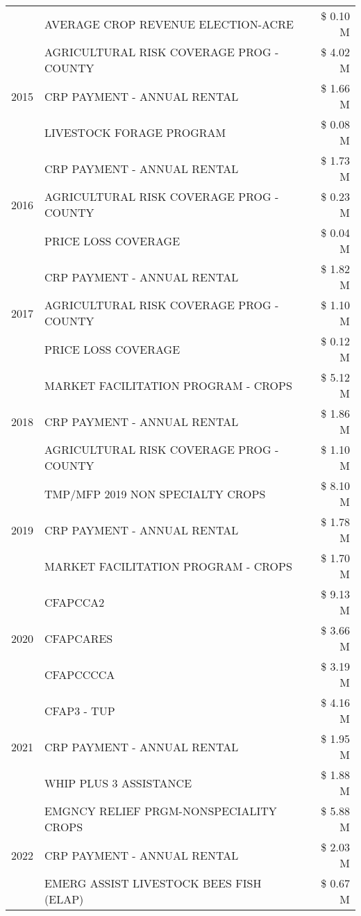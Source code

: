 \begin{tabular}{llr}
 & AVERAGE CROP REVENUE ELECTION-ACRE & \$ 0.10 M \\
\cline{1-3}
\multirow[t]{3}{*}{2015} & AGRICULTURAL RISK COVERAGE PROG - COUNTY & \$ 4.02 M \\
 & CRP PAYMENT - ANNUAL RENTAL & \$ 1.66 M \\
 & LIVESTOCK FORAGE PROGRAM & \$ 0.08 M \\
\cline{1-3}
\multirow[t]{3}{*}{2016} & CRP PAYMENT - ANNUAL RENTAL & \$ 1.73 M \\
 & AGRICULTURAL RISK COVERAGE PROG - COUNTY & \$ 0.23 M \\
 & PRICE LOSS COVERAGE & \$ 0.04 M \\
\cline{1-3}
\multirow[t]{3}{*}{2017} & CRP PAYMENT - ANNUAL RENTAL & \$ 1.82 M \\
 & AGRICULTURAL RISK COVERAGE PROG - COUNTY & \$ 1.10 M \\
 & PRICE LOSS COVERAGE & \$ 0.12 M \\
\cline{1-3}
\multirow[t]{3}{*}{2018} & MARKET FACILITATION PROGRAM - CROPS & \$ 5.12 M \\
 & CRP PAYMENT - ANNUAL RENTAL & \$ 1.86 M \\
 & AGRICULTURAL RISK COVERAGE PROG - COUNTY & \$ 1.10 M \\
\cline{1-3}
\multirow[t]{3}{*}{2019} & TMP/MFP 2019 NON SPECIALTY CROPS & \$ 8.10 M \\
 & CRP PAYMENT - ANNUAL RENTAL & \$ 1.78 M \\
 & MARKET FACILITATION PROGRAM - CROPS & \$ 1.70 M \\
\cline{1-3}
\multirow[t]{3}{*}{2020} & CFAPCCA2 & \$ 9.13 M \\
 & CFAPCARES & \$ 3.66 M \\
 & CFAPCCCCA & \$ 3.19 M \\
\cline{1-3}
\multirow[t]{3}{*}{2021} & CFAP3 - TUP & \$ 4.16 M \\
 & CRP PAYMENT - ANNUAL RENTAL & \$ 1.95 M \\
 & WHIP PLUS 3 ASSISTANCE & \$ 1.88 M \\
\cline{1-3}
\multirow[t]{3}{*}{2022} & EMGNCY RELIEF PRGM-NONSPECIALITY CROPS & \$ 5.88 M \\
 & CRP PAYMENT - ANNUAL RENTAL & \$ 2.03 M \\
 & EMERG ASSIST LIVESTOCK BEES FISH (ELAP) & \$ 0.67 M \\
\cline{1-3}
\bottomrule
\end{tabular}
